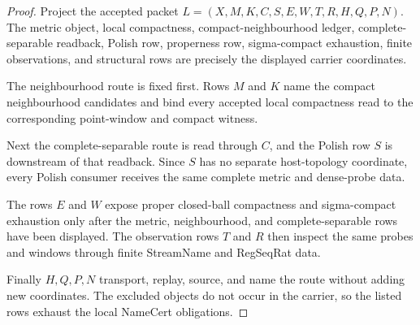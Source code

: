 \begin{proof}
Project the accepted packet $L=(X,M,K,C,S,E,W,T,R,H,Q,P,N)$. The metric object, local compactness, compact-neighbourhood ledger, complete-separable readback, Polish row, properness row, sigma-compact exhaustion, finite observations, and structural rows are precisely the displayed carrier coordinates.

The neighbourhood route is fixed first. Rows $M$ and $K$ name the compact neighbourhood candidates and bind every accepted local compactness read to the corresponding point-window and compact witness.

Next the complete-separable route is read through $C$, and the Polish row $S$ is downstream of that readback. Since $S$ has no separate host-topology coordinate, every Polish consumer receives the same complete metric and dense-probe data.

The rows $E$ and $W$ expose proper closed-ball compactness and sigma-compact exhaustion only after the metric, neighbourhood, and complete-separable rows have been displayed. The observation rows $T$ and $R$ then inspect the same probes and windows through finite StreamName and RegSeqRat data.

Finally $H,Q,P,N$ transport, replay, source, and name the route without adding new coordinates. The excluded objects do not occur in the carrier, so the listed rows exhaust the local NameCert obligations.
\end{proof}

